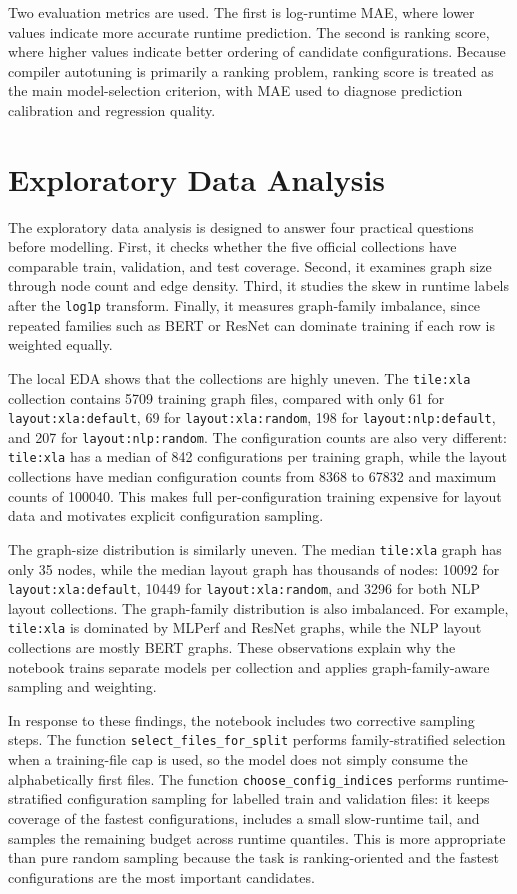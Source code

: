 \documentclass[11pt]{article}
\begin{document}
Two evaluation metrics are used. The first is log-runtime MAE, where lower values indicate more accurate runtime prediction. The second is ranking score, where higher values indicate better ordering of candidate configurations. Because compiler autotuning is primarily a ranking problem, ranking score is treated as the main model-selection criterion, with MAE used to diagnose prediction calibration and regression quality.

\section{Exploratory Data Analysis}
The exploratory data analysis is designed to answer four practical questions before modelling. First, it checks whether the five official collections have comparable train, validation, and test coverage. Second, it examines graph size through node count and edge density. Third, it studies the skew in runtime labels after the \texttt{log1p} transform. Finally, it measures graph-family imbalance, since repeated families such as BERT or ResNet can dominate training if each row is weighted equally.

The local EDA shows that the collections are highly uneven. The \texttt{tile:xla} collection contains 5709 training graph files, compared with only 61 for \texttt{layout:xla:default}, 69 for \texttt{layout:xla:random}, 198 for \texttt{layout:nlp:default}, and 207 for \texttt{layout:nlp:random}. The configuration counts are also very different: \texttt{tile:xla} has a median of 842 configurations per training graph, while the layout collections have median configuration counts from 8368 to 67832 and maximum counts of 100040. This makes full per-configuration training expensive for layout data and motivates explicit configuration sampling.

The graph-size distribution is similarly uneven. The median \texttt{tile:xla} graph has only 35 nodes, while the median layout graph has thousands of nodes: 10092 for \texttt{layout:xla:default}, 10449 for \texttt{layout:xla:random}, and 3296 for both NLP layout collections. The graph-family distribution is also imbalanced. For example, \texttt{tile:xla} is dominated by MLPerf and ResNet graphs, while the NLP layout collections are mostly BERT graphs. These observations explain why the notebook trains separate models per collection and applies graph-family-aware sampling and weighting.

In response to these findings, the notebook includes two corrective sampling steps. The function \texttt{select\_files\_for\_split} performs family-stratified selection when a training-file cap is used, so the model does not simply consume the alphabetically first files. The function \texttt{choose\_config\_indices} performs runtime-stratified configuration sampling for labelled train and validation files: it keeps coverage of the fastest configurations, includes a small slow-runtime tail, and samples the remaining budget across runtime quantiles. This is more appropriate than pure random sampling because the task is ranking-oriented and the fastest configurations are the most important candidates.
\end{document}
